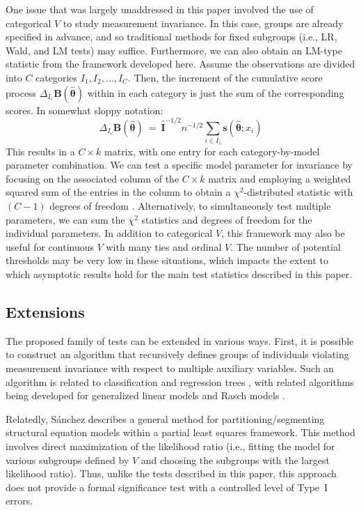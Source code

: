 \documentclass[man]{apa}
\begin{document}
One issue that was largely unaddressed in this paper involved the use
of categorical $V$ to study measurement invariance.  In this case,
groups are 
already specified in advance, and so traditional methods for fixed
subgroups (i.e., LR, Wald, and LM tests) may suffice.
Furthermore, we can also obtain an LM-type statistic from the
framework developed here. Assume the observations are divided into
$C$ categories $I_1, I_2, \ldots, I_C$. Then, the increment of
the cumulative score process $\Delta_{I_c} {\bm B}(\hat {\bm \theta})$
within in each category is just the sum of the corresponding scores.
In somewhat sloppy notation:
\begin{equation}
    \label{eq:catsum}
    \Delta_{I_c} {\bm B}(\hat {\bm \theta}) ~=~ \hat {\bm I}^{-1/2} n^{-1/2}
    \sum_{i \in I_c} {\bm s}(\hat {\bm \theta}; x_i)
\end{equation}
This results in a $C \times k$ matrix, with one entry for
each category-by-model parameter combination.  We can test
a specific model parameter for invariance by focusing on the associated
column of the $C \times k$ matrix and employing a weighted squared sum of
the entries in the column to obtain a $\chi^2$-distributed statistic with
$(C-1)$ degrees of freedom \cite{HjoKon02}.
Alternatively, to simultaneously test multiple parameters, we can sum
the $\chi^2$ statistics and degrees of freedom for the individual
parameters.  In addition to categorical $V$, this framework may also
be useful for continuous $V$ with many ties and ordinal $V$.  
The number of potential thresholds may be very low in these
situations, which impacts the extent to which asymptotic results hold
for the main test statistics described in this paper.

\subsection{Extensions}
The proposed family of tests can be extended in various ways.  First,
it is possible to construct an algorithm that recursively defines
groups of individuals violating measurement invariance with respect to
multiple auxiliary variables.  Such an algorithm is related to 
classification and regression trees \cite{BreFri84,MerSha10,StrMal09},
with related algorithms being developed for generalized linear
models \cite{ZeiHot08} and Rasch models \cite{KopZei10}.  

Relatedly,
S\'{a}nchez \citeyear{San09} describes a general
method for partitioning/segmenting structural equation models within a 
partial least squares framework.  This method involves direct maximization of
the likelihood ratio (i.e., fitting the model for various subgroups
defined by 
$V$ and choosing the subgroups with the largest likelihood ratio).
Thus, unlike the tests described in this paper, this approach does not
provide a formal significance test with a controlled level of Type~I errors.
\end{document}
